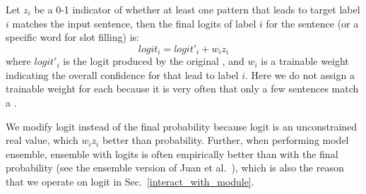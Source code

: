 Let $z_i$ be a 0-1 indicator of whether at least one \RE pattern that leads to target label $i$ matches the input sentence, then the final logits of label $i$ for the sentence (or a specific word for slot filling) is:
\begin{equation}
logit_i = logit'_i + w_i z_i
\end{equation}
where $logit'_i$ is the logit produced by the original \NN, and $w_i$ is a trainable weight indicating the overall confidence for \REs that lead to label $i$.
Here we do not assign a trainable weight for each \RE because it is very often that only a few sentences match a \RE.

We modify logit instead of the final probability because logit is an unconstrained real value, which  $w_i z_i$ better than probability.
Further, when performing model ensemble,
ensemble with logits is often empirically better than with the final probability (see the ensemble version of Juan et al.~), which is also the reason that we operate on logit %
in Sec.~\ref{interact_with_module}.

